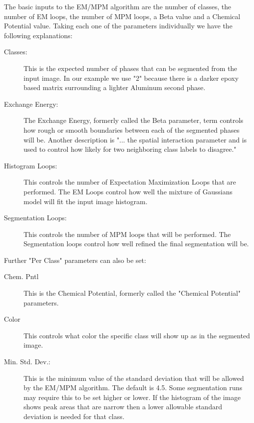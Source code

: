 \documentclass[12pt,oneside]{book}
\begin{document}
The basic inputs to the EM/MPM algorithm are the number of classes, the number of EM loops, the number of MPM loops, a Beta value and a Chemical Potential value. Taking each one of the parameters individually we have the following explanations: 
\begin{description}
\item[Classes:]This is the expected number of phases that can be segmented from the input image. In our example we use "2" because there is a darker epoxy based matrix surrounding a lighter Aluminum second phase. 
\item[Exchange Energy:]  The Exchange Energy, formerly called the Beta parameter, term controls how rough or smooth boundaries between each of the segmented phases will be. Another description is "... the spatial interaction parameter and is used to control how likely for two neighboring class labels to disagree."
\item[Histogram Loops:]  This controls the number of Expectation Maximization Loops that are performed. The EM Loops control how well the mixture of Gaussians model will fit the input image histogram. 
\item[Segmentation Loops:]  This controls the number of MPM loops that will be performed. The Segmentation loops control how well refined the final segmentation will be. 
\end{description}

Further "Per Class" parameters can also be set:
\begin{description}
\item[Chem. Pntl] This is the Chemical Potential, formerly called the "Chemical Potential" parameters.
\item[Color] This controls what color the specific class will show up as in the segmented image.
\item[Min. Std. Dev.:]  This is the minimum value of the standard deviation that will be allowed by the EM/MPM algorithm. The default is 4.5. Some segmentation runs may require this to be set higher or lower. If the histogram of the image shows peak areas that are narrow then a lower allowable standard deviation is needed for that class.
\end{description}
\end{document}
